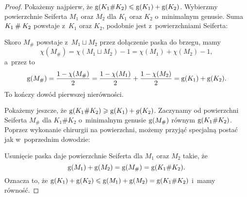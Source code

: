 \begin{proof}
    Pokażemy najpierw, że $\operatorname{g} (K_1 \# K_2) \leqslant \operatorname{g} (K_1) + \operatorname{g} (K_2)$.
    Wybierzmy powierzchnie Seiferta $M_1$ oraz $M_2$ dla $K_1$ oraz $K_2$ o~minimalnym genusie.
    Suma $K_1 \mathbin{\#} K_2$ powstaje z~$K_1$ oraz $K_2$, podobnie jest z~powierzchniami Seiferta:
\begin{comment}
    \begin{figure}[H]
        \centering
        \begin{minipage}[b]{.48\linewidth}
        \[
            \LargeGenusProofA \longrightarrow \LargeGenusProofB
        \]
        \subcaption{suma węzłów}
        \end{minipage}
        \begin{minipage}[b]{.48\linewidth}
        \[
            \LargeGenusProofC \longrightarrow \LargeGenusProofD
        \]
        \subcaption{suma powierzchni}
        \end{minipage}
    \end{figure}
\end{comment}

    Skoro $M_{\#}$ powstaje z~$M_1 \sqcup M_2$ przez dołączenie paska do brzegu, mamy
    \begin{equation}
        \chi(M_{\#}) = \chi(M_1 \sqcup M_2) - 1 = \chi(M_1) + \chi(M_2)-1,
    \end{equation}
    a~przez to
    \begin{equation}
        \operatorname{g} (M_{\#}) = \frac{1-\chi(M_{\#})}{2} =
        \frac{1-\chi(M_1)}{2} + \frac{1-\chi(M_2)}{2}
        = \operatorname{g}(K_1) + \operatorname{g}(K_2).
    \end{equation}
    To kończy dowód pierwszej nierówności.

    Pokażemy jeszcze, że $\operatorname{g} (K_1 \# K_2) \geqslant \operatorname{g} (K_1) + g(K_2)$.
    Zaczynamy od powierzchni Seiferta $M_{\#}$ dla $K_1 \# K_2$ o~minimalnym genusie $\operatorname{g} (M_{\#})$ równym $\operatorname{g} (K_1 \# K_2)$.
    Poprzez wykonanie chirurgii na powierzchni, możemy przyjąć specjalną postać jak w~poprzednim dowodzie:
\begin{comment}
    \[
        \LargeGenusProofD
    \]
\end{comment}

    Usunięcie paska daje powierzchnie Seiferta dla $M_1$ oraz $M_2$ takie, że
    \begin{equation}
        \operatorname{g}(M_1) + \operatorname{g}(M_2) = \operatorname{g}(M_{\#}) = \operatorname{g}(K_1 \# K_2).
    \end{equation}
    Oznacza to, że $\operatorname{g}(K_1) + \operatorname{g}(K_2) \leqslant \operatorname{g}(M_1) + \operatorname{g}(M_2) = \operatorname{g}(K_1 \# K_2)$ i~mamy równość.
\end{proof}

